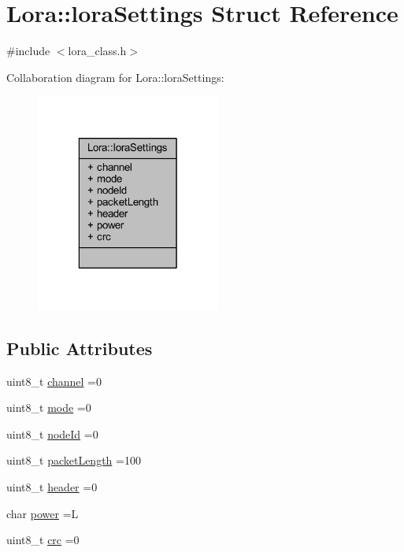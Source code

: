\hypertarget{struct_lora_1_1lora_settings}{}\section{Lora\+:\+:lora\+Settings Struct Reference}
\label{struct_lora_1_1lora_settings}


{\ttfamily \#include $<$lora\+\_\+class.\+h$>$}



Collaboration diagram for Lora\+:\+:lora\+Settings\+:\nopagebreak
\begin{figure}[H]
\begin{center}
\leavevmode
\includegraphics[width=172pt]{struct_lora_1_1lora_settings__coll__graph}
\end{center}
\end{figure}
\subsection*{Public Attributes}
\begin{DoxyCompactItemize}
\item 
uint8\+\_\+t \hyperlink{struct_lora_1_1lora_settings_aea7869124f4eb6c2acfdf9bd01509839}{channel} =0
\item 
uint8\+\_\+t \hyperlink{struct_lora_1_1lora_settings_ab190860612308c8827e1e8825e33ce0c}{mode} =0
\item 
uint8\+\_\+t \hyperlink{struct_lora_1_1lora_settings_af3be9bceb1775ed3791c5fbfe3362983}{node\+Id} =0
\item 
uint8\+\_\+t \hyperlink{struct_lora_1_1lora_settings_af0a81f87a3cca6265b4d03c795f995de}{packet\+Length} =100
\item 
uint8\+\_\+t \hyperlink{struct_lora_1_1lora_settings_a04610a8a79a155c273c8d7a756c818f6}{header} =0
\item 
char \hyperlink{struct_lora_1_1lora_settings_aeb2cbc4b48b9678e06ca0f6dab172726}{power} =\textquotesingle{}L\textquotesingle{}
\item 
uint8\+\_\+t \hyperlink{struct_lora_1_1lora_settings_ae1637739d45abc72ee8d4d2d599d5c42}{crc} =0
\end{DoxyCompactItemize}


